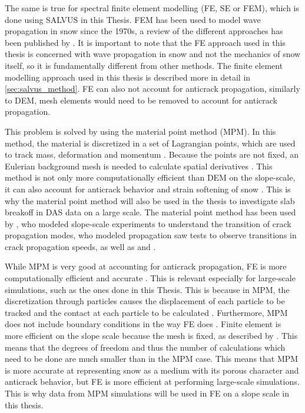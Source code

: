 The same is true for spectral finite element modelling (FE, SE or FEM), which is done using SALVUS in this Thesis. FEM has been used to model wave propagation in snow since the 1970s, a review of the different approaches has been published by \cite{podolskiyReviewFiniteelementModelling2013}. It is important to note that the FE approach used in this thesis is concerned with wave propagation in snow and not the mechanics of snow itself, so it is fundamentally different from other methods. The finite element modelling approach used in this thesis is described more in detail in \ref{sec:salvus_method}. FE can also not account for anticrack propagation, similarly to DEM, mesh elements would need to be removed to account for anticrack propagation. \par

This problem is solved by using the material point method (MPM). In this method, the material is discretized in a set of Lagrangian points, which are used to track mass, deformation and momentum \parencite{bardenhagenMaterialpointMethodGranular2000}. Because the points are not fixed, an Eulerian background mesh is needed to calculate spatial derivatives \parencite{bardenhagenMaterialpointMethodGranular2000}. This method is not only more computationally efficient than DEM on the slope-scale, it can also account for anticrack behavior and strain softening of snow \parencite{gaumeInvestigatingReleaseFlow2019}. This is why the material point method will also be used in the thesis to investigate slab breakoff in DAS data on a large scale. The material point method has been used by \cite{bergfeldSignaturesSubRayleighSupershear2025}, who modeled slope-scale experiments to understand the transition of crack propagation modes, \cite{trottetTransitionSubRayleighAnticrack2022} who modeled propagation saw tests to observe transitions in crack propagation speeds, as well as \cite{gaumeInvestigatingReleaseFlow2019} and \cite{gaumeDynamicAnticrackPropagation2018}. \par

While MPM is very good at accounting for anticrack propagation, FE is more computationally efficient and accurate \parencite{lianAdaptiveFiniteElement2012}. This is relevant especially for large-scale simulations, such as the ones done in this Thesis. This is because in MPM, the discretization through particles causes the displacement of each particle to be tracked and the contact at each particle to be calculated \parencite{zhangModellingLargescaleLandslide2023}. Furthermore, MPM does not include boundary conditions in the way FE does \parencite{coombsImmersedFEMMPM2025}. Finite element is more efficient on the slope scale because the mesh is fixed, as described by \parencite{FiniteElementMethod}. This means that the degrees of freedom and thus the number of calculations which need to be done are much smaller than in the MPM case. This means that MPM is more accurate at representing snow as a medium with its porous character and anticrack behavior, but FE is more efficient at performing large-scale simulations. This is why data from MPM simulations will be used in FE on a slope scale in this thesis. \par


